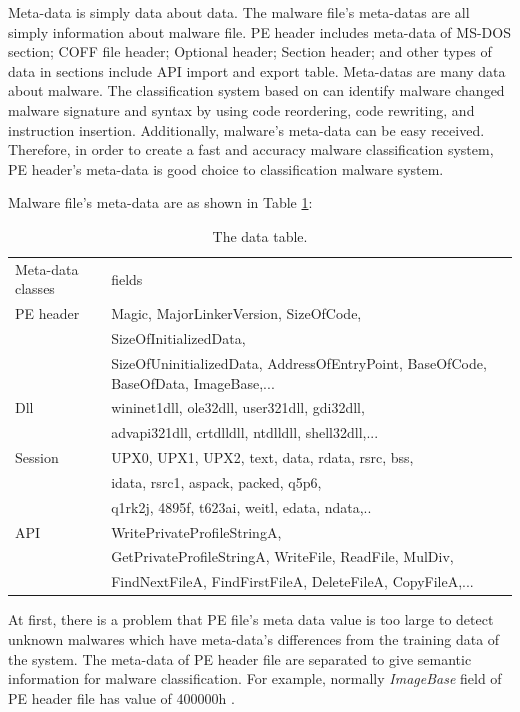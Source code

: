 Meta-data is simply data about data. The malware file's meta-datas are all simply information about malware file. PE header includes meta-data of MS-DOS section; COFF file header; Optional header; Section header; and other types of data in sections include API import and export table. Meta-datas are many data about malware. The classification system based on can identify malware changed malware signature and syntax by using code reordering, code rewriting, and instruction insertion. Additionally, malware's meta-data can be easy received. Therefore, in order to create a fast and accuracy malware classification system, PE header's meta-data is good choice to classification malware system. 

Malware file's meta-data are as shown in Table \ref{table:metadata}:
\begin{table}
\begin{center}
    \begin{tabular}{ | l | l |}
     \hline
    Meta-data classes & fields \\
  PE header & Magic, MajorLinkerVersion, SizeOfCode,\\
  & SizeOfInitializedData, \\
 & SizeOfUninitializedData, AddressOfEntryPoint, BaseOfCode, BaseOfData, ImageBase,... \\ 
 \hline
	Dll &   wininet1dll, ole32dll, user321dll, gdi32dll,\\ 
	 & advapi321dll, crtdlldll, ntdlldll, shell32dll,...\\ 
	 \hline
	Session &  UPX0, UPX1, UPX2, text, data, rdata, rsrc, bss, \\
 & idata, rsrc1, aspack, packed, q5p6, \\
 & q1rk2j, 4895f, t623ai, weitl, edata, ndata,.. \\ 
 \hline
	API &  WritePrivateProfileStringA, \\
& GetPrivateProfileStringA, WriteFile, ReadFile, MulDiv,\\
& FindNextFileA, FindFirstFileA, DeleteFileA, CopyFileA,...\\  
 \hline
    \end{tabular}
	\end{center}
     \caption{The data table.}
    \label{table:metadata}
\end{table}

At first, there is a problem that PE file's meta data value is too large to detect unknown malwares which have meta-data's differences from the training data of the system. The meta-data of PE header file are separated  to give semantic information for malware classification. For example, normally \emph{ImageBase} field of PE header file has value of 400000h \cite{goppit}. 

